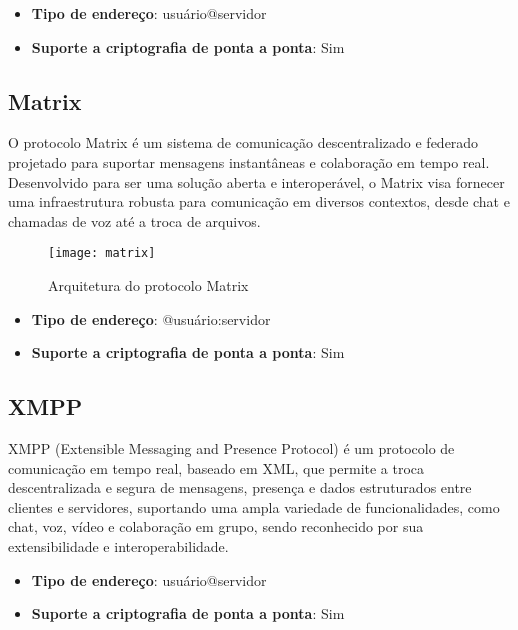 \begin{itemize}
  \item \textbf{Tipo de endereço}: usuário@servidor
  \item \textbf{Suporte a criptografia de ponta a ponta}: Sim
\end{itemize}

\subsection{Matrix}

O protocolo Matrix é um sistema de comunicação descentralizado e federado projetado para suportar mensagens instantâneas e colaboração em tempo real. Desenvolvido para ser uma solução aberta e interoperável, o Matrix visa fornecer uma infraestrutura robusta para comunicação em diversos contextos, desde chat e chamadas de voz até a troca de arquivos. \cite{matrixspec}

\begin{figure}
  \centering
  \texttt{[image: matrix]}

  \caption{Arquitetura do protocolo Matrix \cite{matrixspec}}
\end{figure}

\begin{itemize}
  \item \textbf{Tipo de endereço}: @usuário:servidor
  \item \textbf{Suporte a criptografia de ponta a ponta}: Sim
\end{itemize}

\subsection{XMPP}

XMPP (Extensible Messaging and Presence Protocol) é um protocolo de comunicação em tempo real, baseado em XML, que permite a troca descentralizada e segura de mensagens, presença e dados estruturados entre clientes e servidores, suportando uma ampla variedade de funcionalidades, como chat, voz, vídeo e colaboração em grupo, sendo reconhecido por sua extensibilidade e interoperabilidade. \cite{xmppspec}

\begin{itemize}
  \item \textbf{Tipo de endereço}: usuário@servidor
  \item \textbf{Suporte a criptografia de ponta a ponta}: Sim
\end{itemize}

